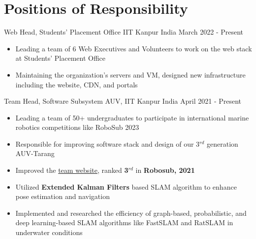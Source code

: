\section*{\sc Positions of Responsibility}
\vspace{-2mm}
\hrulefill
\vspace{1mm}

\cventry
{Web Head, Students' Placement Office} %
{IIT Kanpur} %
{India} %
{March 2022 - Present} %
{
  \begin{itemize} %
    \item Leading a team of 6 Web Executives and Volunteers to work on the web stack at Students' Placement Office
    \item Maintaining the organization’s servers and VM, designed new infrastructure including the website, CDN, and portals
  \end{itemize}
}

\cventry
{Team Head, Software Subsystem} %
{AUV, IIT Kanpur} %
{India} %
{April 2021 - Present} %
{
  \begin{itemize} %
    \item Leading a team of 50+ undergraduates to participate in international marine robotics competitions like RoboSub 2023 
    \item Responsible for improving software stack and design of our 3$^{rd}$ generation AUV-Tarang
    \item {Improved the \href{https://auv.sntiitk.in/}{team website}, ranked \textbf{3$^{rd}$} in \textbf{Robosub, 2021}}
    \item Utilized \textbf{Extended Kalman Filters} based SLAM algorithm to enhance pose estimation and navigation
    \item Implemented and researched the efficiency of graph-based, probabilistic, and deep learning-based SLAM algorithms like FastSLAM and RatSLAM in underwater conditions
  \end{itemize}
}

